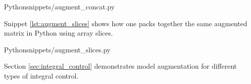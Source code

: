\begin{code}{Python}{snippets/augment_concat.py}
  \caption{Matrix augmentation example: concatenation}
  \label{lst:augment_concat}
\end{code}

Snippet \ref{lst:augment_slices} shows how one packs together the same augmented
matrix in Python using array slices.

\begin{code}{Python}{snippets/augment_slices.py}
  \caption{Matrix augmentation example: array slices}
  \label{lst:augment_slices}
\end{code}

Section \ref{sec:integral_control} demonstrates \gls{model} augmentation for
different types of integral control.
